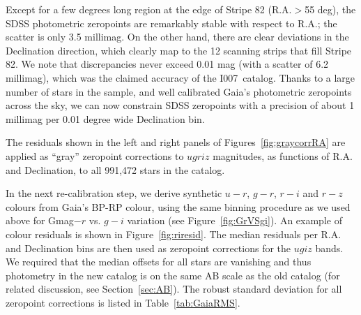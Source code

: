 \documentclass[fleqn,usenatbib]{mnras}
\newcommand{\pOc}{\hbox{I007 catalog}}
\begin{document}
Except for a few degrees long region at the edge of Stripe 82 (R.A.$>$55 deg), the
SDSS photometric zeropoints are remarkably stable with respect to R.A.; the scatter
is only 3.5 millimag. On the other hand, there are clear deviations in the Declination 
direction, which clearly map to the 12 scanning strips that fill Stripe 82. We note
that discrepancies never exceed 0.01 mag (with a scatter of 6.2 millimag), which was 
the claimed accuracy of the \pOc. Thanks to a large number of stars in the sample,
and well calibrated Gaia's photometric zeropoints across the sky, we can now 
constrain SDSS zeropoints with a precision of about 1 millimag per 0.01 degree
wide Declination bin. 

The residuals shown in the left and right panels of Figures~\ref{fig:graycorrRA} are
applied as ``gray'' zeropoint corrections to $ugriz$ magnitudes, as functions of 
R.A. and Declination, to all 991,472 stars in the catalog. %

In the next re-calibration step, we derive synthetic $u-r$, $g-r$, $r-i$ and $r-z$ colours
from Gaia's BP-RP colour, using the same binning procedure as we used above for 
Gmag$-r$ vs. $g-i$ variation (see Figure~\ref{fig:GrVSgi}). An example of colour residuals 
is shown in Figure~\ref{fig:riresid}.  The median residuals per R.A. and Declination bins 
are then used as zeropoint corrections for the $ugiz$ bands. We required that the median
offsets for all stars are vanishing and thus photometry in the new catalog is on the 
same AB scale as the old catalog (for related discussion, see Section~\ref{sec:AB}). 
The robust standard deviation for all zeropoint corrections is listed in Table~\ref{tab:GaiaRMS}. 

\end{document}
